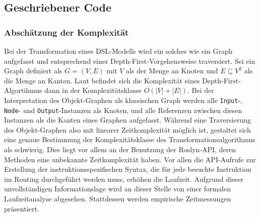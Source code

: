 \subsection{Geschriebener Code}

\subsubsection{Abschätzung der Komplexität}
\label{subsubsec:Abschaetzung der Komplexitaet}
Bei der Transformation eines DSL-Modells wird ein solches wie ein Graph aufgefasst und entsprechend einer Depth-First-Vorgehensweise traversiert. Sei ein Graph definiert als $G = (V, E)$ mit $V$ als der Menge an Knoten und $E \subseteq V^{2}$ als die Menge an Kanten. Laut \cite[S. 479]{Cormen:90} befindet sich die Komplexität eines Depth-First-Algortihmus dann in der Komplexitätsklasse $O(\left\vert{V}\right\vert + \left\vert{E}\right\vert)$. Bei der Interpretation des Objekt-Graphen als klassischen Graph werden alle \texttt{Input}-, \texttt{Node}- und \texttt{Output}-Instanzen als Knoten, und alle Referenzen zwischen diesen Instanzen als die Kanten eines Graphen aufgefasst. Während eine Traversierung des Objekt-Graphen also mit linearer Zeitkomplexität möglich ist, gestaltet sich eine genaue Bestimmung der Komplexitätsklasse des Transformationsalgorithmus als schwierig. Dies liegt vor allem an der Benutzung der Roslyn-API, deren Methoden eine unbekannte Zeitkomplexität haben. Vor allen die API-Aufrufe zur Erstellung der instruktionsspezifischen Syntax, die für jede besuchte Instruktion im Routing durchgeführt werden muss, erhöhen die Laufzeit.
\newline
Aufgrund dieser unvollständigen Informationslage wird an dieser Stelle von einer formalen Laufzeitanalyse abgesehen. Stattdessen werden empirische Zeitmessungen präsentiert.

